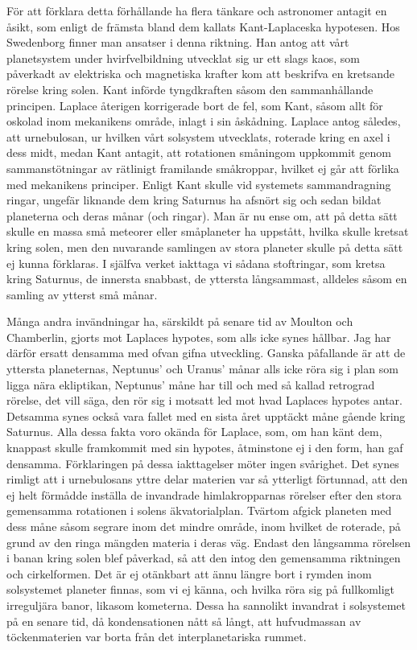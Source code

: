 \documentclass[a4paper, 12pt, oneside, swedish]{article}
\begin{document}
För att förklara detta förhållande ha flera tänkare och astronomer antagit en åsikt, som enligt de främsta bland dem kallats Kant-Laplaceska hypotesen. Hos Swedenborg finner man ansatser i denna riktning. Han antog att vårt planetsystem under hvirfvelbildning utvecklat sig ur ett slags kaos, som påverkadt av elektriska och magnetiska krafter kom att beskrifva en kretsande rörelse kring solen. Kant införde tyngdkraften såsom den sammanhållande principen. Laplace återigen korrigerade bort de fel, som Kant, såsom allt för oskolad inom mekanikens område, inlagt i sin åskådning. Laplace antog således, att urnebulosan, ur hvilken vårt solsystem utvecklats, roterade kring en axel i dess midt, medan Kant antagit, att rotationen småningom uppkommit genom sammanstötningar av rätlinigt framilande småkroppar, hvilket ej går att förlika med mekanikens principer. Enligt Kant skulle vid systemets sammandragning ringar, ungefär liknande dem kring Saturnus ha afsnört sig och sedan bildat planeterna och deras månar (och ringar). Man är nu ense om, att på detta sätt skulle en massa små meteorer eller småplaneter ha uppstått, hvilka skulle kretsat kring solen, men den nuvarande samlingen av stora planeter skulle på detta sätt ej kunna förklaras. I själfva verket iakttaga vi sådana stoftringar, som kretsa kring Saturnus, de innersta snabbast, de yttersta långsammast, alldeles såsom en samling av ytterst små månar.

Många andra invändningar ha, särskildt på senare tid av Moulton och Chamberlin, gjorts mot Laplaces hypotes, som alls icke synes hållbar. Jag har därför ersatt densamma med ofvan gifna utveckling. Ganska påfallande är att de yttersta planeternas, Neptunus' och Uranus' månar alls icke röra sig i plan som ligga nära ekliptikan, Neptunus' måne har till och med så kallad retrograd rörelse, det vill säga, den rör sig i motsatt led mot hvad Laplaces hypotes antar. Detsamma synes också vara fallet med en sista året upptäckt måne gående kring Saturnus. Alla dessa fakta voro okända för Laplace, som, om han känt dem, knappast skulle framkommit med sin hypotes, åtminstone ej i den form, han gaf densamma. Förklaringen på dessa iakttagelser möter ingen svårighet. Det synes rimligt att i urnebulosans yttre delar materien var så ytterligt förtunnad, att den ej helt förmådde inställa de invandrade himlakropparnas rörelser efter den stora gemensamma rotationen i solens äkvatorialplan. Tvärtom afgick planeten med dess måne såsom segrare inom det mindre område, inom hvilket de roterade, på grund av den ringa mängden materia i deras väg. Endast den långsamma rörelsen i banan kring solen blef påverkad, så att den intog den gemensamma riktningen och cirkelformen. Det är ej otänkbart att ännu längre bort i rymden inom solsystemet planeter finnas, som vi ej känna, och hvilka röra sig på fullkomligt irreguljära banor, likasom kometerna. Dessa ha sannolikt invandrat i solsystemet på en senare tid, då kondensationen nått så långt, att hufvudmassan av töckenmaterien var borta från det interplanetariska rummet.
\end{document}
